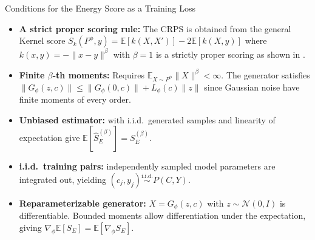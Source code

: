 \begin{frame}{Conditions for the Energy Score as a Training Loss}

\begin{itemize}
    \item \textbf{A strict proper scoring rule:}
    The CRPS is obtained from the general Kernel score $S_k(P^\phi, y) = \mathbb{E}[k(X,X')] - 2\mathbb{E}[k(X,y)]$
    where $k(x,y) = -\|x-y\|^\beta$ with $\beta = 1$ is a strictly proper scoring as shown in \cite{srforgan:srforgan}.
    \item \textbf{Finite $\beta$-th moments:}
    Requires $\mathbb{E}_{X\sim P^\phi}\|X\|^\beta<\infty$. The generator satisfies
    $\|G_\phi(z,c)\|\leq\|G_\phi(0,c)\|+L_\phi(c)\|z\|$ since
    Gaussian noise have finite moments of every order. 
    \cite{srforgan:srforgan}

    \item \textbf{Unbiased estimator:}
    with i.i.d.\ generated samples and linearity of expectation give
    $\mathbb{E}[\widehat S_E^{(\beta)}]=S_E^{(\beta)}$.

    \item \textbf{i.i.d.\ training pairs:}
    independently sampled model parameters are integrated out, yielding
    $(c_j,y_j)\stackrel{\mathrm{i.i.d.}}{\sim}P(C,Y)$.

    \item \textbf{Reparameterizable generator:}
    $X=G_\phi(z,c)$ with $z\sim\mathcal N(0,I)$ is differentiable.
    Bounded moments allow differentiation under the expectation, giving
    $\nabla_\phi\mathbb{E}[S_E]=\mathbb{E}[\nabla_\phi S_E]$.
\end{itemize}

\end{frame}